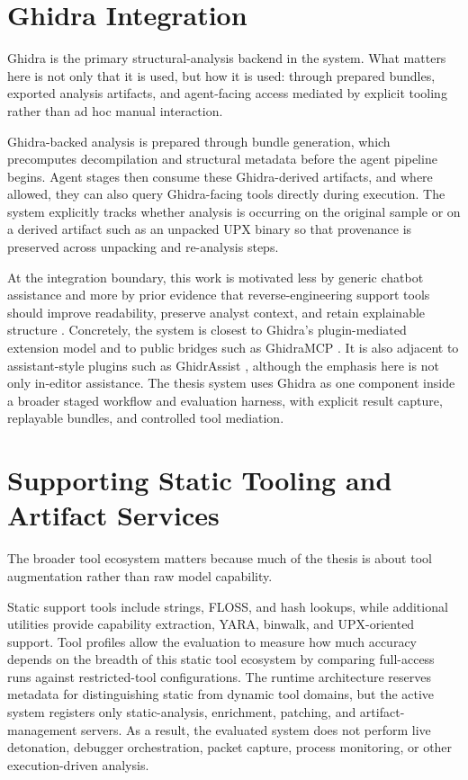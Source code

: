 \section{Ghidra Integration}

Ghidra is the primary structural-analysis backend in the system. What matters here is not only that it is used, but how it is used: through prepared bundles, exported analysis artifacts, and agent-facing access mediated by explicit tooling rather than ad hoc manual interaction.

Ghidra-backed analysis is prepared through bundle generation, which precomputes decompilation and structural metadata before the agent pipeline begins. Agent stages then consume these Ghidra-derived artifacts, and where allowed, they can also query Ghidra-facing tools directly during execution. The system explicitly tracks whether analysis is occurring on the original sample or on a derived artifact such as an unpacked UPX binary so that provenance is preserved across unpacking and re-analysis steps.

At the integration boundary, this work is motivated less by generic chatbot assistance and more by prior evidence that reverse-engineering support tools should improve readability, preserve analyst context, and retain explainable structure \cite{yakdan2016johnny,schwartz2018logic}. Concretely, the system is closest to Ghidra's plugin-mediated extension model \cite{ghidraplugin2025} and to public bridges such as GhidraMCP \cite{ghidramcp2025}. It is also adjacent to assistant-style plugins such as GhidrAssist \cite{ghidrassist2025}, although the emphasis here is not only in-editor assistance. The thesis system uses Ghidra as one component inside a broader staged workflow and evaluation harness, with explicit result capture, replayable bundles, and controlled tool mediation.

\section{Supporting Static Tooling and Artifact Services}

The broader tool ecosystem matters because much of the thesis is about tool augmentation rather than raw model capability.

Static support tools include strings, FLOSS, and hash lookups, while additional utilities provide capability extraction, YARA, binwalk, and UPX-oriented support. Tool profiles allow the evaluation to measure how much accuracy depends on the breadth of this static tool ecosystem by comparing full-access runs against restricted-tool configurations. The runtime architecture reserves metadata for distinguishing static from dynamic tool domains, but the active system registers only static-analysis, enrichment, patching, and artifact-management servers. As a result, the evaluated system does not perform live detonation, debugger orchestration, packet capture, process monitoring, or other execution-driven analysis.

